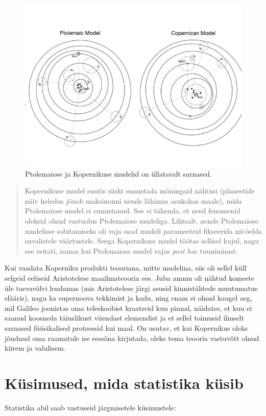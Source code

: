 \documentclass[]{book}
\begin{document}
\begin{figure}
\includegraphics[width=0.5\linewidth]{img/kop} \caption{Ptolemaiose ja Kopernikuse mudelid on üllatavalt sarnased.}\label{fig:unnamed-chunk-4}
\end{figure}

\begin{quote}
Kopernikuse mudel suutis siiski ennustada mõningaid nähtusi (planeetide näiv heledus jõuab maksimumi nende lähimas asukohas maale), mida Ptolemaiose mudel ei ennustanud. See ei tähenda, et need fenomenid oleksid olnud vastuolus Ptolemaiose mudeliga. Lihtsalt, nende Ptolemaiose mudelisse sobitamiseks oli vaja osad mudeli parameetrid fikseerida nii-öelda suvalistele väärtustele. Seega Kopernikuse mudel töötas sellisel kujul, nagu see esitati, samas kui Ptolemaiose mudel vajas \emph{post hoc} tuunimimst.
\end{quote}

Kui vaadata Koperniku produkti teooriana, mitte mudelina, siis oli sellel küll selgeid eeliseid Aristotelese maailmateooria ees. Juba ammu oli nähtud komeete üle taevavõlvi lendamas (mis Aristotelese järgi asusid kinnistähtede muutumatus sfääris), nagu ka supernoova tekkimist ja kadu, ning enam ei olnud kaugel aeg, mil Galileo joonistas oma teleskoobist kraatreid kuu pinnal, näidates, et kuu ei saanud koosneda täiuslikust viiendast elemendist ja et sellel toimusid ilmselt sarnased füüsikalised protsessid kui maal. On usutav, et kui Kopernikus oleks jõudnud oma raamatule ise eessõna kirjutada, oleks tema teooria vastuvõtt olnud kiirem ja valulisem.

\hypertarget{kusimused-mida-statistika-kusib}{%
\chapter{Küsimused, mida statistika küsib}\label{kusimused-mida-statistika-kusib}}

Statistika abil saab vastuseid järgmisetele küsimustele:
\end{document}
